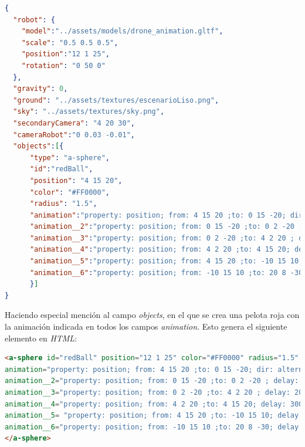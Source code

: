 \begin{lstlisting}[language=json]
{
  "robot": {
    "model":"../assets/models/drone_animation.gltf",
    "scale": "0.5 0.5 0.5",
    "position":"12 1 25",
    "rotation": "0 50 0"
  },
  "gravity": 0,
  "ground": "../assets/textures/escenarioLiso.png",
  "sky": "../assets/textures/sky.png",
  "secondaryCamera": "4 20 30",
  "cameraRobot":"0 0.03 -0.01",
  "objects":[{
      "type": "a-sphere",
      "id":"redBall",
      "position": "4 15 20",
      "color": "#FF0000",
      "radius": "1.5",
      "animation":"property: position; from: 4 15 20 ;to: 0 15 -20; dir: alternate; dur: 10000; loop: true",
      "animation__2":"property: position; from: 0 15 -20 ;to: 0 2 -20 ; delay: 10000; dir: alternate; dur: 10000; loop: true",
      "animation__3":"property: position; from: 0 2 -20 ;to: 4 2 20 ; delay: 20000; dir: alternate; dur: 10000; loop: true",
      "animation__4":"property: position; from: 4 2 20 ;to: 4 15 20; delay: 30000; dir: alternate; dur: 10000; loop: true",
      "animation__5":"property: position; from: 4 15 20 ;to: -10 15 10; delay: 40000; dir: alternate; dur: 10000; loop: true",
      "animation__6":"property: position; from: -10 15 10 ;to: 20 8 -30; delay: 50000; dir: alternate; dur: 10000; loop: true"
      }]
}
\end{lstlisting}

Haciendo especial mención al campo \textit{objects}, en el que se crea una pelota roja con la animación indicada en todos los campos \textit{animation}. Esto genera el siguiente elemento en \textit{HTML}:

\begin{lstlisting}[language=html]
<a-sphere id="redBall" position="12 1 25" color="#FF0000" radius="1.5" 
animation="property: position; from: 4 15 20 ;to: 0 15 -20; dir: alternate; dur: 10000; loop: true"
animation__2="property: position; from: 0 15 -20 ;to: 0 2 -20 ; delay: 10000; dir: alternate; dur: 10000; loop: true"
animation__3="property: position; from: 0 2 -20 ;to: 4 2 20 ; delay: 20000; dir: alternate; dur: 10000; loop: true" 
animation__4="property: position; from: 4 2 20 ;to: 4 15 20; delay: 30000; dir: alternate; dur: 10000; loop: true"
animation__5= "property: position; from: 4 15 20 ;to: -10 15 10; delay: 40000; dir: alternate; dur: 10000; loop: true"
animation__6="property: position; from: -10 15 10 ;to: 20 8 -30; delay: 50000; dir: alternate; dur: 10000; loop: true">
</a-sphere>
\end{lstlisting}

